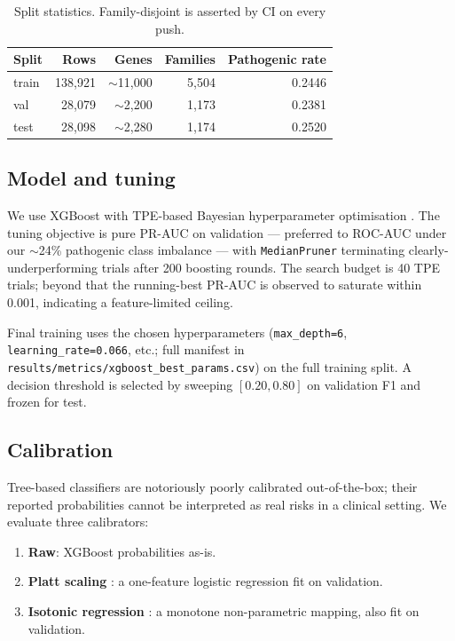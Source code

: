 \documentclass[11pt,a4paper]{article}
\begin{document}
\begin{table}[h]
\centering
\caption{Split statistics. Family-disjoint is asserted by
CI on every push.}
\label{tab:splits}
\small
\begin{tabular}{@{} l r r r r @{}}
\toprule
Split & Rows & Genes & Families & Pathogenic rate \\
\midrule
train & 138{,}921 & \(\sim\)11{,}000 & 5{,}504 & 0.2446 \\
val   &  28{,}079 & \(\sim\)2{,}200  & 1{,}173 & 0.2381 \\
test  &  28{,}098 & \(\sim\)2{,}280  & 1{,}174 & 0.2520 \\
\bottomrule
\end{tabular}
\end{table}

\subsection{Model and tuning}
\label{sec:methods-model}

We use XGBoost \citep{chen2016xgboost} with TPE-based Bayesian
hyperparameter optimisation \citep{akiba2019optuna}. The tuning
objective is pure PR-AUC on validation --- preferred to ROC-AUC
under our \(\sim\)24\% pathogenic class imbalance --- with
\texttt{MedianPruner} terminating clearly-underperforming trials
after 200 boosting rounds. The search budget is 40 TPE trials;
beyond that the running-best PR-AUC is observed to saturate within
0.001, indicating a feature-limited ceiling.

Final training uses the chosen hyperparameters (\texttt{max\_depth=6},
\texttt{learning\_rate=0.066}, etc.; full manifest in
\texttt{results/metrics/xgboost\_best\_params.csv}) on the full
training split. A decision threshold is selected by sweeping
\([0.20, 0.80]\) on validation F1 and frozen for test.

\subsection{Calibration}
\label{sec:methods-calibration}

Tree-based classifiers are notoriously poorly calibrated
out-of-the-box; their reported probabilities cannot be interpreted
as real risks in a clinical setting. We evaluate three
calibrators:

\begin{enumerate}
    \item \textbf{Raw}: XGBoost probabilities as-is.
    \item \textbf{Platt scaling} \citep{platt1999probabilistic}:
          a one-feature logistic regression fit on validation.
    \item \textbf{Isotonic regression} \citep{zadrozny2002transforming}:
          a monotone non-parametric mapping, also fit on validation.
\end{enumerate}
\end{document}
